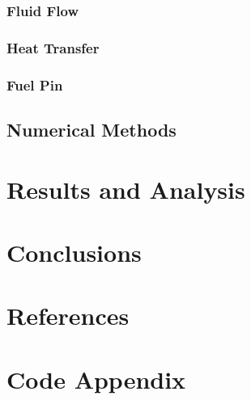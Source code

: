 \documentclass{article}
\begin{document}
\subsubsection{Fluid Flow}

\subsubsection{Heat Transfer}

\subsubsection{Fuel Pin}

\subsection{Numerical Methods}

\section{Results and Analysis}

\section{Conclusions}

\section{References}

\section{Code Appendix}
\begin{python}

\end{python}
\end{document}
